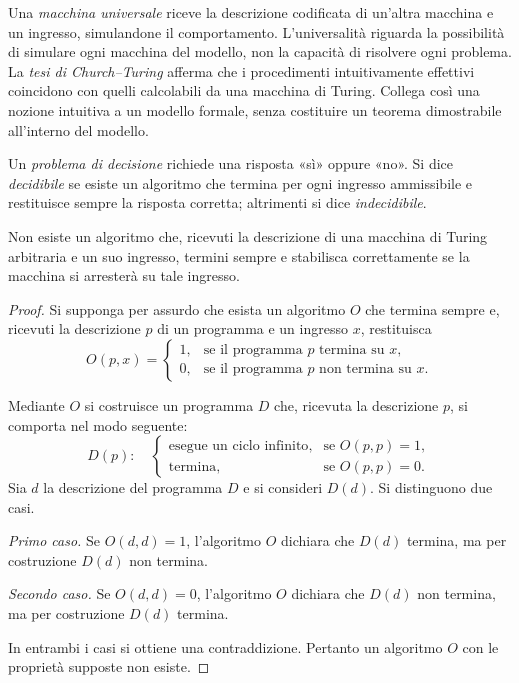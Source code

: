Una \emph{macchina universale} riceve la descrizione codificata di
un'altra macchina e un ingresso, simulandone il comportamento.
L'universalità riguarda la possibilità di simulare ogni macchina
del modello, non la capacità di risolvere ogni problema.
La \emph{tesi di Church--Turing} afferma che i procedimenti
intuitivamente effettivi coincidono con quelli calcolabili da una
macchina di Turing. Collega così una nozione intuitiva a un modello
formale, senza costituire un teorema dimostrabile all'interno del modello.

\begin{definition}
\label{def:fi-decidibilita}
Un \emph{problema di decisione} richiede una risposta «sì» oppure «no».
Si dice \emph{decidibile} se esiste un algoritmo che termina per ogni
ingresso ammissibile e restituisce sempre la risposta corretta;
altrimenti si dice \emph{indecidibile}.
\end{definition}

\begin{proposition}
\label{prop:fi-problema-arresto}
Non esiste un algoritmo che, ricevuti la descrizione di una macchina
di Turing arbitraria e un suo ingresso, termini sempre e stabilisca
correttamente se la macchina si arresterà su tale ingresso.
\end{proposition}

\begin{proof}
Si supponga per assurdo che esista un algoritmo \(O\) che termina
sempre e, ricevuti la descrizione \(p\) di un programma e un ingresso
\(x\), restituisca
\[
  O(p,x)=
  \begin{cases}
    1, & \text{se il programma \(p\) termina su \(x\)},\\
    0, & \text{se il programma \(p\) non termina su \(x\)}.
  \end{cases}
\]

Mediante \(O\) si costruisce un programma \(D\) che, ricevuta la
descrizione \(p\), si comporta nel modo seguente:
\[
  D(p):\quad
  \begin{cases}
    \text{esegue un ciclo infinito}, & \text{se } O(p,p)=1,\\
    \text{termina}, & \text{se } O(p,p)=0.
  \end{cases}
\]
Sia \(d\) la descrizione del programma \(D\) e si consideri
\(D(d)\). Si distinguono due casi.

\emph{Primo caso.}
Se \(O(d,d)=1\), l'algoritmo \(O\) dichiara che \(D(d)\) termina,
ma per costruzione \(D(d)\) non termina.

\emph{Secondo caso.}
Se \(O(d,d)=0\), l'algoritmo \(O\) dichiara che \(D(d)\) non termina,
ma per costruzione \(D(d)\) termina.

In entrambi i casi si ottiene una contraddizione. Pertanto un
algoritmo \(O\) con le proprietà supposte non esiste.
\end{proof}

